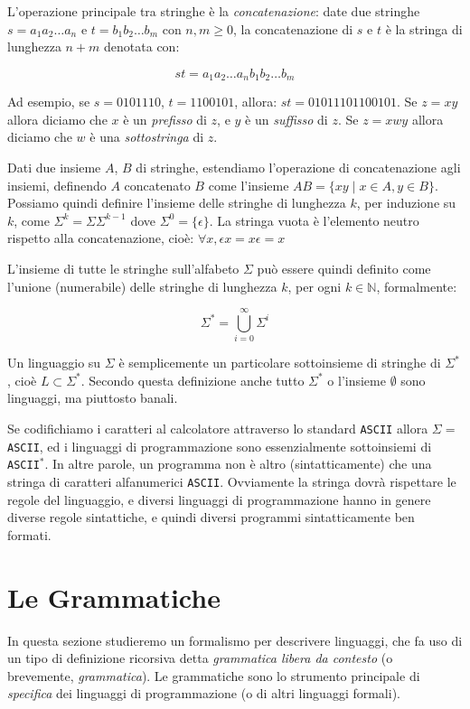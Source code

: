 L'operazione principale tra stringhe è la \emph{concatenazione}: date due stringhe $s = a_1a_2\ldots a_n$ e $t = b_1b_2\ldots b_m$ con $n,m \geq 0$, la concatenazione di $s$ e $t$ è la stringa di lunghezza $n+m$ denotata con:

\[ st = a_1a_2\ldots a_nb_1b_2\ldots b_m \]

Ad esempio, se $s = 0101110$, $t = 1100101$, allora: $st = 01011101100101$.  Se $z = xy$ allora diciamo che $x$ è un
\emph{prefisso} di $z$, e $y$ è un \emph{suffisso} di $z$. Se $z = xwy$ allora diciamo che $w$ è una \emph{sottostringa} di $z$.

Dati due insieme $A$, $B$ di stringhe, estendiamo l'operazione di concatenazione agli insiemi, definendo $A$ concatenato $B$ come l'insieme $AB = \{ xy \;|\; x \in A, y \in B \}$. Possiamo quindi definire l'insieme delle stringhe di lunghezza $k$,
per induzione su $k$, come $\Sigma^k = \Sigma \Sigma^{k-1}$ dove $\Sigma^0 = \{ \epsilon \}$. La stringa vuota è l'elemento neutro rispetto alla concatenazione, cioè: $\forall x, \epsilon x = x \epsilon = x$

L'insieme di tutte le stringhe sull'alfabeto $\Sigma$ può essere quindi definito come l'unione (numerabile) delle stringhe di lunghezza $k$, per ogni $k \in \mathbb{N}$, formalmente:

\[ \Sigma^* = \bigcup_{i=0}^{\infty} \Sigma^i \]

Un linguaggio su $\Sigma$ è semplicemente un particolare sottoinsieme di stringhe di $\Sigma^*$, cioè $L \subset \Sigma^*$. Secondo questa definizione anche tutto $\Sigma^*$ o l'insieme $\emptyset$ sono linguaggi, ma piuttosto banali. 

Se codifichiamo i caratteri al calcolatore attraverso lo standard \verb"ASCII" allora $\Sigma = $\verb"ASCII", ed i linguaggi di programmazione sono essenzialmente sottoinsiemi di \verb"ASCII"$^*$.  In altre parole, un programma non è altro (sintatticamente) che una stringa di caratteri alfanumerici \verb"ASCII". Ovviamente la stringa dovrà rispettare le regole del linguaggio, e diversi linguaggi di programmazione hanno in genere diverse regole sintattiche, e quindi diversi programmi sintatticamente ben formati.

\section{Le Grammatiche}

In questa sezione studieremo un formalismo per descrivere linguaggi, che fa uso di un tipo di definizione ricorsiva detta \emph{grammatica libera da contesto} (o brevemente, \emph{grammatica}). Le grammatiche sono lo strumento principale di \emph{specifica} dei linguaggi di programmazione (o di altri linguaggi formali).

